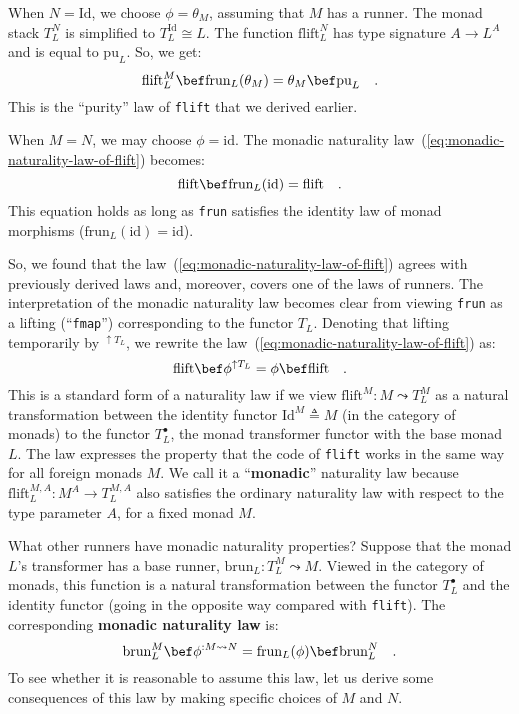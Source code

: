 When $N=\text{Id}$, we choose $\phi=\theta_{M}$, assuming that $M$
has a runner. The monad stack $T_{L}^{N}$ is simplified to $T_{L}^{\text{Id}}\cong L$.
The function $\text{flift}_{L}^{N}$ has type signature $A\rightarrow L^{A}$
and is equal to $\text{pu}_{L}$. So, we get:
\[
\text{flift}_{L}^{M}\bef\text{frun}_{L}(\theta_{M})=\theta_{M}\bef\text{pu}_{L}\quad.
\]
This is the \textsf{``}purity\textsf{''} law of \lstinline!flift! that we derived
earlier.

When $M=N$, we may choose $\phi=\text{id}$. The monadic naturality
law~(\ref{eq:monadic-naturality-law-of-flift}) becomes:
\[
\text{flift}\bef\text{frun}_{L}(\text{id})=\text{flift}\quad.
\]
This equation holds as long as \lstinline!frun! satisfies the identity
law of monad morphisms ($\text{frun}_{L}(\text{id})=\text{id}$).

So, we found that the law~(\ref{eq:monadic-naturality-law-of-flift})
agrees with previously derived laws and, moreover, covers one of the
laws of runners. The interpretation of the monadic naturality law
becomes clear from viewing \lstinline!frun! as a lifting (\textsf{``}\lstinline!fmap!\textsf{''})
corresponding to the functor $T_{L}$. Denoting that lifting temporarily
by $^{\uparrow T_{L}}$, we rewrite the law~(\ref{eq:monadic-naturality-law-of-flift})
as:
\[
\text{flift}\bef\phi^{\uparrow T_{L}}=\phi\bef\text{flift}\quad.
\]
This is a standard form of a naturality law if we view $\text{flift}^{M}:M\leadsto T_{L}^{M}$
as a natural
transformation between the identity functor $\text{Id}^{M}\triangleq M$
(in the category of monads) to the functor $T_{L}^{\bullet}$, the
monad transformer functor with the base monad $L$. The law expresses
the property that the code of \lstinline!flift! works in the same
way for all foreign monads $M$. We call it a \textsf{``}\textbf{monadic}\textsf{''}
naturality law
because $\text{flift}_{L}^{M,A}:M^{A}\rightarrow T_{L}^{M,A}$ also
satisfies the ordinary naturality law with respect to the type parameter
$A$, for a fixed monad $M$.

What other runners have monadic naturality properties? Suppose that
the monad $L$\textsf{'}s transformer has a base runner, $\text{brun}_{L}:T_{L}^{M}\leadsto M$.
Viewed in the category of monads, this function is a natural transformation
between the functor $T_{L}^{\bullet}$ and the identity functor (going
in the opposite way compared with \lstinline!flift!). The corresponding
\textbf{monadic naturality law}
is:
\[
\text{brun}_{L}^{M}\bef\phi^{:M\leadsto N}=\text{frun}_{L}(\phi)\bef\text{brun}_{L}^{N}\quad.
\]
To see whether it is reasonable to assume this law, let us derive
some consequences of this law by making specific choices of $M$ and
$N$.

